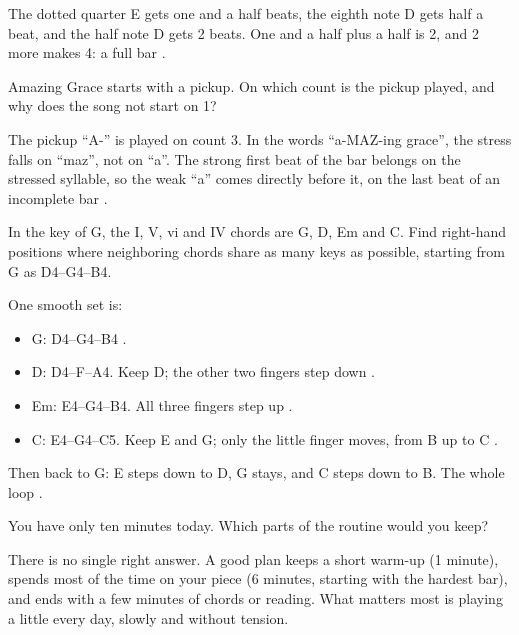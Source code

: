 \begin{answerbox}
The dotted quarter E gets one and a half beats, the eighth note D gets half a beat, and the half note D gets 2 beats. One and a half plus a half is 2, and 2 more makes 4: a full bar .
\end{answerbox}

\begin{exercise}
Amazing Grace starts with a pickup. On which count is the pickup played, and why does the song not start on 1?
\end{exercise}

\begin{answerbox}
The pickup ``A-'' is played on count 3. In the words ``a-MAZ-ing grace'', the stress falls on ``maz'', not on ``a''. The strong first beat of the bar belongs on the stressed syllable, so the weak ``a'' comes directly before it, on the last beat of an incomplete bar .
\end{answerbox}

\begin{exercise}
In the key of G, the I, V, vi and IV chords are G, D, Em and C. Find right-hand positions where neighboring chords share as many keys as possible, starting from G as D4--G4--B4.
\end{exercise}

\begin{answerbox}
One smooth set is:
\begin{itemize}
  \item G: D4--G4--B4 .
  \item D: D4--F--A4. Keep D; the other two fingers step down .
  \item Em: E4--G4--B4. All three fingers step up .
  \item C: E4--G4--C5. Keep E and G; only the little finger moves, from B up to C .
\end{itemize}
Then back to G: E steps down to D, G stays, and C steps down to B. The whole loop .
\end{answerbox}

\begin{exercise}
You have only ten minutes today. Which parts of the routine would you keep?
\end{exercise}

\begin{answerbox}
There is no single right answer. A good plan keeps a short warm-up (1 minute), spends most of the time on your piece (6 minutes, starting with the hardest bar), and ends with a few minutes of chords or reading. What matters most is playing a little every day, slowly and without tension.
\end{answerbox}
